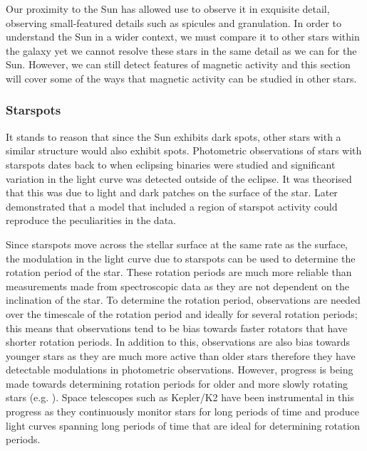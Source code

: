 Our proximity to the Sun has allowed use to observe it in exquisite detail, observing small-featured details such as spicules and granulation. In order to understand the Sun in a wider context, we must compare it to other stars within the galaxy yet we cannot resolve these stars in the same detail as we can for the Sun. However, we can still detect features of magnetic activity and this section will cover some of the ways that magnetic activity can be studied in other stars.

\subsubsection{Starspots}
It stands to reason that since the Sun exhibits dark spots, other stars with a similar structure would also exhibit spots. Photometric observations of stars with starspots dates back to \citet{Kron_1947} when eclipsing binaries were studied and significant variation in the light curve was detected outside of the eclipse. It was theorised that this was due to light and dark patches on the surface of the star. Later \citet{Hall_1972} demonstrated that a model that included a region of starspot activity could reproduce the peculiarities in the data.

Since starspots move across the stellar surface at the same rate as the surface, the modulation in the light curve due to starspots can be used to determine the rotation period of the star. These rotation periods are much more reliable than measurements made from spectroscopic data as they are not dependent on the inclination of the star. To determine the rotation period, observations are needed over the timescale of the rotation period and ideally for several rotation periods; this means that observations tend to be bias towards faster rotators that have shorter rotation periods. In addition to this, observations are also bias towards younger stars as they are much more active than older stars therefore they have detectable modulations in photometric observations. However, progress is being made towards determining rotation periods for older and more slowly rotating stars (e.g. \citealt{Barnes_etal_2016,Douglas_etal_2016,Lanzafame_etal_2018}). Space telescopes such as Kepler/K2 have been instrumental in this progress as they continuously monitor stars for long periods of time and produce light curves spanning long periods of time that are ideal for determining rotation periods.

